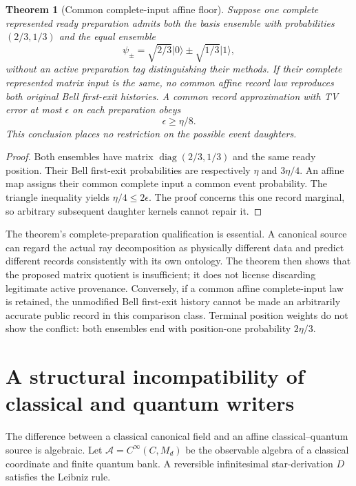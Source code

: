 \documentclass[11pt,oneside,openany]{book}
\newtheorem{theorem}{Theorem}[chapter]
\theoremstyle{definition}
\theoremstyle{remark}\newtheorem{remark}[theorem]{Remark}
\begin{document}
\begin{theorem}[Common complete-input affine floor]\label{acc:affine}
Suppose one complete represented ready preparation admits both the basis
ensemble with probabilities $(2/3,1/3)$ and the equal ensemble
\[
 \psi_\pm=\sqrt{2/3}\lvert0\rangle
 \pm\sqrt{1/3}\lvert1\rangle,
\]
without an active preparation tag distinguishing their methods. If their
complete represented matrix input is the same, no common affine record
law reproduces both original Bell first-exit histories. A common record
approximation with TV error at most $\epsilon$ on each preparation obeys
\begin{equation}
 \epsilon\ge\eta/8.
 \label{acc:affinefloor}
\end{equation}
This conclusion places no restriction on the possible event daughters.
\end{theorem}
\begin{proof}
Both ensembles have matrix $\operatorname{diag}(2/3,1/3)$ and the same
ready position. Their Bell first-exit probabilities are respectively
$\eta$ and $3\eta/4$. An affine map assigns their common complete input a
common event probability. The triangle inequality yields
$\eta/4\le2\epsilon$. The proof concerns this one record marginal, so
arbitrary subsequent daughter kernels cannot repair it.
\end{proof}

The theorem's complete-preparation qualification is essential. A canonical
source can regard the actual ray decomposition as physically different
data and predict different records consistently with its own ontology.
The theorem then shows that the proposed matrix quotient is insufficient;
it does not license discarding legitimate active provenance. Conversely,
if a common affine complete-input law is retained, the unmodified Bell
first-exit history cannot be made an arbitrarily accurate public record in
this comparison class. Terminal position weights do not show the conflict:
both ensembles end with position-one probability $2\eta/3$.

\section{A structural incompatibility of classical and quantum writers}
The difference between a classical canonical field and an affine
classical--quantum source is algebraic. Let
$\mathcal A=C^\infty(C,M_d)$ be the observable algebra of a classical
coordinate and finite quantum bank. A reversible infinitesimal
star-derivation $D$ satisfies the Leibniz rule.
\end{document}
